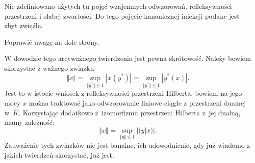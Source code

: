 \documentclass[a4paper,11pt]{article}
\begin{document}
\vspace{\spaceFour}


\start {} Nie zdefiniowano użytych tu pojęć wzajemnych
odwzorowań, refleksywności przestrzeni i słabej zwartości. Do tego
pojęcie kanonicznej iniekcji podane jest zbyt zwięźle.

\vspace{\spaceFour}


\start {} Poprawić uwagę na dole strony.

\vspace{\spaceFour}


\start {} W dowodzie tego arcyważnego twierdzenia jest pewna
skrótowość. Należy bowiem skorzystać z ważnego związku:
\begin{equation}
  \label{eq:SchwartzKAMVolI-03}
  \Vert x \Vert = \sup_{ \Vert y^{ * } \Vert \leq 1 } | x( y^{ * } ) |
  =
  \sup_{ \Vert y^{ * } \Vert \leq 1 } | y^{ * }( x ) |.
\end{equation}
Jest to w istocie wniosek z refleksywności przestrzeni Hilberta,
bowiem na jego mocy $x$ można traktować jako odwzorowanie liniowe
ciągłe z przestrzeni dualnej w~$K$. Korzystając dodatkowo z~izomorfizmu przestrzeni Hilberta z~jej dualną, mamy
zależność:
\begin{equation}
  \label{eq:SchwartzKAMVolI-04}
  \Vert x \Vert = \sup_{ \Vert y \Vert \leq 1 } | ( y | x ) |.
\end{equation}
Zauważenie tych związków nie jest banalne, ich udowodnienie, gdy już
wiadomo z jakich twierdzeń skorzystać, już jest.

\vspace{\spaceFour}






\end{document}
